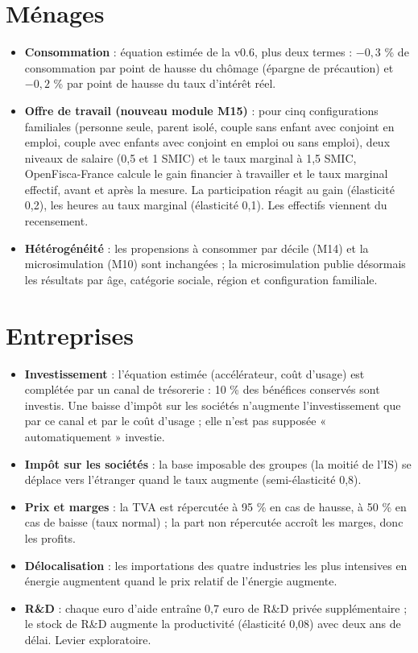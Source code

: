\section{Ménages}

\begin{itemize}
\item \textbf{Consommation} : équation estimée de la v0.6, plus deux termes : $-0{,}3$ \% de consommation par point de
hausse du chômage (épargne de précaution) et $-0{,}2$ \% par point de hausse du taux d'intérêt réel.
\item \textbf{Offre de travail (nouveau module M15)} : pour cinq configurations familiales (personne seule, parent
isolé, couple sans enfant avec conjoint en emploi, couple avec enfants avec conjoint en emploi ou sans emploi), deux
niveaux de salaire (0,5 et 1 SMIC) et le taux marginal à 1,5 SMIC, OpenFisca-France calcule le gain financier à
travailler et le taux marginal effectif, avant et après la mesure. La participation réagit au gain (élasticité 0,2),
les heures au taux marginal (élasticité 0,1). Les effectifs viennent du recensement.
\item \textbf{Hétérogénéité} : les propensions à consommer par décile (M14) et la microsimulation (M10) sont
inchangées ; la microsimulation publie désormais les résultats par âge, catégorie sociale, région et configuration
familiale.
\end{itemize}

\section{Entreprises}

\begin{itemize}
\item \textbf{Investissement} : l'équation estimée (accélérateur, coût d'usage) est complétée par un canal de
trésorerie : 10 \% des bénéfices conservés sont investis. Une baisse d'impôt sur les sociétés n'augmente
l'investissement que par ce canal et par le coût d'usage ; elle n'est pas supposée « automatiquement » investie.
\item \textbf{Impôt sur les sociétés} : la base imposable des groupes (la moitié de l'IS) se déplace vers l'étranger
quand le taux augmente (semi-élasticité 0,8).
\item \textbf{Prix et marges} : la TVA est répercutée à 95 \% en cas de hausse, à 50 \% en cas de baisse (taux
normal) ; la part non répercutée accroît les marges, donc les profits.
\item \textbf{Délocalisation} : les importations des quatre industries les plus intensives en énergie augmentent
quand le prix relatif de l'énergie augmente.
\item \textbf{R\&D} : chaque euro d'aide entraîne 0,7 euro de R\&D privée supplémentaire ; le stock de R\&D augmente la
productivité (élasticité 0,08) avec deux ans de délai. Levier exploratoire.
\end{itemize}

